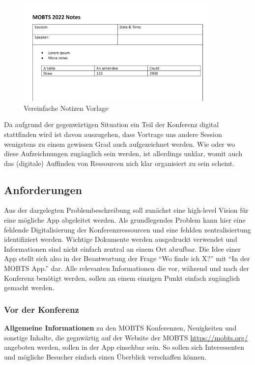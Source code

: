 \begin{figure}
    \begin{center}
        \includegraphics[width=0.9\textwidth]{img/notes_template.PNG}
    
    \end{center}
    \caption{Vereinfache Notizen Vorlage}
    \label{fig:notes-template}
\end{figure}

Da aufgrund der gegenwärtigen Situation ein Teil der Konferenz digital stattfinden wird ist davon auszugehen, dass Vortrage uns andere Session wenigstens zu einem gewissen Grad auch aufgezeichnet werden.
Wie oder wo diese Aufzeichnungen zugänglich sein werden, ist allerdings unklar, womit auch das (digitale) Auffinden von Ressourcen nich klar organisiert zu sein scheint. 

\subsection{Anforderungen}
Aus der dargelegten Problembeschreibung soll zunächst eine high-level Vision für eine mögliche App abgeleitet werden.
Als grundlegendes Problem kann hier eine fehlende Digitalisierung der Konferenzressourcen und eine fehlden zentralisiertung identifiziert werden.
Wichtige Dokumente werden ausgedruckt verwendet und Informationen sind nicht einfach zentral an einem Ort abrufbar.
Die Idee einer App stellt sich also in der Beantwortung der Frage \enquote{Wo finde ich X?} mit \enquote{In der \ac{MOBTS} App.} dar.
Alle relevanten Informationen die vor, während und nach der Konferenz benötigt werden, sollen an einem einzigen Punkt einfach zugänglich gemacht werden.

\subsubsection*{Vor der Konferenz}
\textbf{Allgemeine Informationen} zu den \ac{MOBTS} Konferenzen, Neuigkeiten und sonstige Inhalte, die gegnwärtig auf der Website der \ac{MOBTS} \url{https://mobts.org/} angeboten werden, sollen in der App einsehbar sein.
So sollen sich Interessenten und mögliche Besucher einfach einen Überblick verschaffen können.

